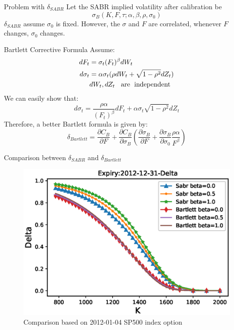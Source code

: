 \documentclass[10pt,table,mathserif]{beamer}
\begin{document}
\begin{frame}{Problem with $\delta_{SABR}$ }
Let the SABR implied volatility after calibration be
\[
\sigma_B(K,F,\tau;\alpha,\beta,\rho,\sigma_0)
\]
$\delta_{SABR}$ assume $\sigma_0$  is fixed. However, the $\sigma$ and $F$ are correlated, whenever $F$ changes, $\sigma_0$ changes.
\end{frame}


\begin{frame}{Bartlett Corrective Formula}
Assume:
\[
\begin{split}
dF_t&=\sigma_t (F_t)^{\beta}dW_t\\
d\sigma_t&=\alpha \sigma_t( \rho dW_t+\sqrt{1-\rho^2} dZ_t)\\
&dW_t, dZ_t \; \text{\; are\; independent}
\end{split}
\]
We can easily show that:
\[
d\sigma_t=\frac{\rho \alpha}{(F_t)^\beta}dF_t+\alpha \sigma_t \sqrt{1-\rho^2} dZ_t
\]
Therefore, a better Bartlett formula is given by:
\[
\delta_{Bartlett}=\frac{\partial C_{B}}{\partial F} + \frac{\partial C_{B}}{\partial \sigma_B}
\left( \frac{\partial \sigma_B}{\partial F}+\frac{\partial \sigma_B}{\partial \sigma_0}\frac{\rho \alpha}{ F^{\beta}}\right)
\label{eq:bartlett}
\]
\end{frame}
\begin{frame}{Comparison between $\delta_{SABR}$ and $\delta_{Bartlett}$ }
\begin{figure}
	\includegraphics[width=\textwidth]{Bartlett}
	\caption{Comparison based on 2012-01-04 SP500 index option}
\end{figure}
\end{frame}
\end{document}
